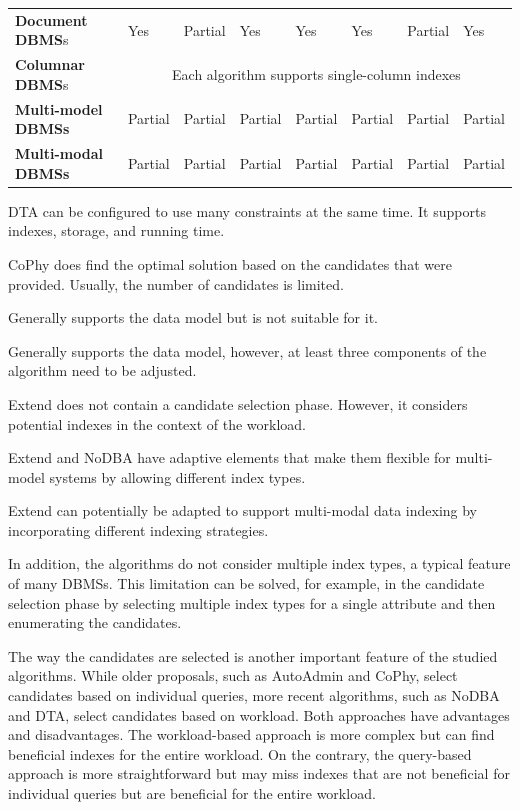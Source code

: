 {\begin{landscape}
\begin{table}[!ht]
\begin{threeparttable}
\begin{tabular}{llllllll}
        \textbf{Document DBMS}s & Yes\tnote{3} & Partial & Yes & Yes & Yes\tnote{3} & Partial & Yes \\
        \textbf{Columnar DBMS}s &\multicolumn{7}{c}{Each algorithm supports single-column indexes}  \\
        \textbf{Multi-model DBMSs} & Partial & Partial & Partial & Partial & Partial\tnote{6} & Partial\tnote{6} & Partial \\
        \textbf{Multi-modal DBMSs} & Partial & Partial & Partial & Partial & Partial\tnote{7} & Partial & Partial \\
        \bottomrule
    \end{tabular}
    \begin{tablenotes}
        \item[1] DTA can be configured to use many constraints at the same time. It supports indexes, storage, and running time.
        \item[2] CoPhy does find the optimal solution based on the candidates that were provided. Usually, the number of candidates is limited.
        \item[3] Generally supports the data model but is not suitable for it.
        \item[4] Generally supports the data model, however, at least three components of the algorithm need to be adjusted.
        \item[5] Extend does not contain a candidate selection phase. However, it considers potential indexes in the context of the workload.
        \item[6] Extend and NoDBA have adaptive elements that make them flexible for multi-model systems by allowing different index types.
        \item[7] Extend can potentially be adapted to support multi-modal data indexing by incorporating different indexing strategies.
    \end{tablenotes}
    \end{threeparttable}
\end{table}
\end{landscape}
}

In addition, the algorithms do not consider multiple index types, a typical feature of many DBMSs. This limitation can be solved, for example, in the candidate selection phase by selecting multiple index types for a single attribute and then enumerating the candidates.

The way the candidates are selected is another important feature of the studied algorithms. While older proposals, such as AutoAdmin and CoPhy, select candidates based on individual queries, more recent algorithms, such as NoDBA and DTA, select candidates based on workload. Both approaches have advantages and disadvantages. The workload-based approach is more complex but can find beneficial indexes for the entire workload. On the contrary, the query-based approach is more straightforward but may miss indexes that are not beneficial for individual queries but are beneficial for the entire workload.


